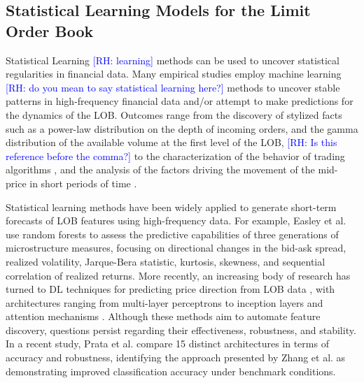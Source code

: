 \documentclass[10pt,a4paper,oneside]{article}
\newcommand{\rh}[1]{\textcolor{blue}{\textsf{[RH: #1]}}}
\begin{document}
\subsection{Statistical Learning Models for the Limit Order Book}
\label{SubSect:LM}
Statistical Learning \rh{learning} methods \cite{hastie2017elements} can be used to uncover statistical regularities in financial data. Many empirical studies employ machine learning \rh{do you mean to say statistical learning here?} methods to uncover stable patterns in high-frequency financial data and/or attempt to make predictions for the dynamics of the LOB. Outcomes range from the discovery of stylized facts such as a power-law distribution on the depth of incoming orders, and the gamma distribution of the available volume at the first level of the LOB, \cite{Bouchaud_2002} \rh{Is this reference before the comma?} to the characterization of the behavior of trading algorithms \cite{cartea2023statistical}, and the analysis of the factors driving the movement of the mid-price in short periods of time \cite{cont2013price, cont2023cross, CENESIZOGLU202277}.

Statistical learning methods have been widely applied to generate short-term forecasts of LOB features using high-frequency data. For example, Easley et al. \cite{easley2021microstructure} use random forests to assess the predictive capabilities of three generations of microstructure measures, focusing on directional changes in the bid-ask spread, realized volatility, Jarque-Bera statistic, kurtosis, skewness, and sequential correlation of realized returns. More recently, an increasing body of research has turned to DL techniques for predicting price direction from LOB data \cite{tsantekidis2017using, Zhang_2019, zhang2021deeplearningmarketorder, kolm2023deep, kolm2024improving, briola2024deep, prata2024lob}, with architectures ranging from multi-layer perceptrons \cite{tsantekidis2017using} to inception layers \cite{Zhang_2019} and attention mechanisms \cite{zhang2021deeplearningmarketorder}. Although these methods aim to automate feature discovery, questions persist regarding their effectiveness, robustness, and stability. In a recent study, Prata et al. \cite{prata2024lob} compare 15 distinct architectures in terms of accuracy and robustness, identifying the approach presented by Zhang et al. \cite{zhang2021deeplearningmarketorder} as demonstrating improved classification accuracy under benchmark conditions.
\end{document}
